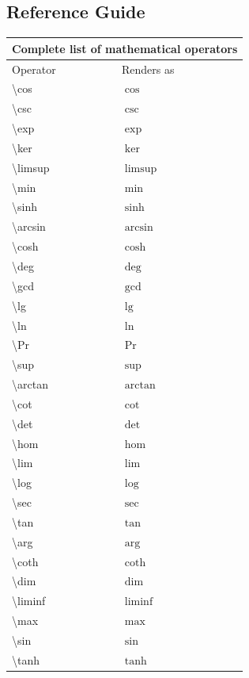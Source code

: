 \documentclass{article}
\begin{document}
\subsection*{Reference Guide}
\begin{tabular}{|l|l|}
	\hline 
	\multicolumn{2}{|c|}{Complete list of mathematical operators} \\
	
	\hline
	Operator &Renders as \\
	
	\hline
	\textbackslash cos & $\cos$ \\
	\textbackslash csc & $\csc$ \\
	\textbackslash exp & $\exp$ \\
	\textbackslash ker & $\ker$ \\
	\textbackslash limsup & $\limsup$ \\
	\textbackslash min & $\min$ \\
	\textbackslash sinh & $\sinh$ \\
	\textbackslash arcsin & $\arcsin$ \\
	\textbackslash cosh & $\cosh$ \\
	\textbackslash deg & $\deg$ \\
	\textbackslash gcd & $\gcd$ \\
	\textbackslash lg & $\lg$ \\
	\textbackslash ln & $\ln$ \\
	\textbackslash Pr & $\Pr$ \\
	\textbackslash sup & $\sup$ \\
	\textbackslash arctan & $\arctan$ \\
	\textbackslash cot & $\cot$ \\
	\textbackslash det & $\det$ \\
	\textbackslash hom & $\hom$ \\
	\textbackslash lim & $\lim$ \\
	\textbackslash log & $\log$ \\
	\textbackslash sec & $\sec$ \\
	\textbackslash tan & $\tan$ \\
	\textbackslash arg & $\arg$ \\
	\textbackslash coth & $\coth$ \\
	\textbackslash dim & $\dim$ \\
	\textbackslash liminf & $\liminf$ \\
	\textbackslash max & $\max$ \\
	\textbackslash sin & $\sin$ \\
	\textbackslash tanh & $\tanh$ \\
	\hline
	
\end{tabular}
\end{document}
